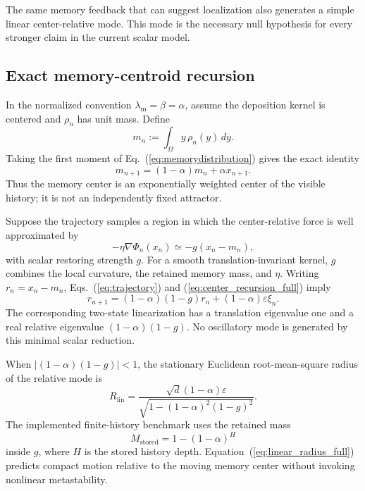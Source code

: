 \documentclass[reprint,amsmath,amssymb,aps,prd,nofootinbib,floatfix]{revtex4-2}
\begin{document}
The same memory feedback that can suggest localization also generates a simple
linear center-relative mode.
This mode is the necessary null hypothesis for every stronger claim in the
current scalar model.

\subsection{Exact memory-centroid recursion}

In the normalized convention $\lambda_{\mathrm m}=\beta=\alpha$, assume the
deposition kernel is centered and $\rho_n$ has unit mass.
Define
\begin{equation}
m_n:=\int_\Omega y\,\rho_n(y)\,dy .
\label{eq:memory_centroid_full}
\end{equation}
Taking the first moment of Eq.~(\ref{eq:memorydistribution}) gives the exact
identity
\begin{equation}
m_{n+1}=(1-\alpha)m_n+\alpha x_{n+1}.
\label{eq:center_recursion_full}
\end{equation}
Thus the memory center is an exponentially weighted center of the visible
history; it is not an independently fixed attractor.

Suppose the trajectory samples a region in which the center-relative force is
well approximated by
\begin{equation}
-\eta\nabla\Phi_n(x_n)\simeq-g(x_n-m_n),
\label{eq:linear_force_full}
\end{equation}
with scalar restoring strength $g$.
For a smooth translation-invariant kernel, $g$ combines the local curvature,
the retained memory mass, and $\eta$.
Writing $r_n=x_n-m_n$, Eqs.~(\ref{eq:trajectory}) and
(\ref{eq:center_recursion_full}) imply
\begin{equation}
r_{n+1}=(1-\alpha)(1-g)r_n
 +(1-\alpha)\varepsilon\xi_n .
\label{eq:relative_mode_full}
\end{equation}
The corresponding two-state linearization has a translation eigenvalue one
and a real relative eigenvalue $(1-\alpha)(1-g)$.
No oscillatory mode is generated by this minimal scalar reduction.

When $|(1-\alpha)(1-g)|<1$, the stationary Euclidean root-mean-square radius
of the relative mode is
\begin{equation}
R_{\mathrm{lin}}
=\frac{\sqrt{d}(1-\alpha)\varepsilon}
{\sqrt{1-(1-\alpha)^2(1-g)^2}}.
\label{eq:linear_radius_full}
\end{equation}
The implemented finite-history benchmark uses the retained mass
\begin{equation}
M_{\mathrm{stored}}=1-(1-\alpha)^H
\end{equation}
inside $g$, where $H$ is the stored history depth.
Equation~(\ref{eq:linear_radius_full}) predicts compact motion relative to the
moving memory center without invoking nonlinear metastability.
\end{document}
